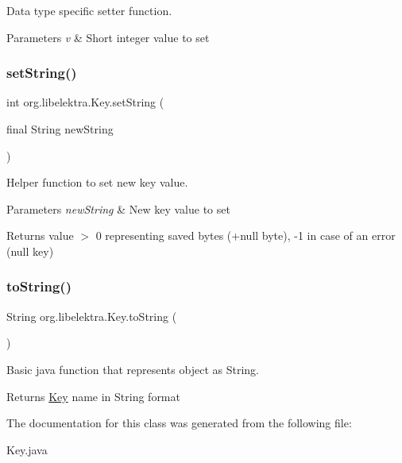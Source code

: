 Data type specific setter function. 


\begin{DoxyParams}{Parameters}
{\em v} & Short integer value to set \\
\hline
\end{DoxyParams}
\mbox{\label{classorg_1_1libelektra_1_1Key_a5ccfaddf110c47c83686655a694ee76d}} 
\subsubsection{\texorpdfstring{set\+String()}{setString()}}
{\footnotesize\ttfamily int org.\+libelektra.\+Key.\+set\+String (\begin{DoxyParamCaption}\item[{final String}]{new\+String }\end{DoxyParamCaption})\hspace{0.3cm}{\ttfamily [inline]}}



Helper function to set new key value. 


\begin{DoxyParams}{Parameters}
{\em new\+String} & New key value to set \\
\hline
\end{DoxyParams}
\begin{DoxyReturn}{Returns}
value $>$ 0 representing saved bytes (+null byte), -\/1 in case of an error (null key) 
\end{DoxyReturn}
\mbox{\label{classorg_1_1libelektra_1_1Key_a2814202c93e4f4dac842b2d4856ba78e}} 
\subsubsection{\texorpdfstring{to\+String()}{toString()}}
{\footnotesize\ttfamily String org.\+libelektra.\+Key.\+to\+String (\begin{DoxyParamCaption}{ }\end{DoxyParamCaption})\hspace{0.3cm}{\ttfamily [inline]}}



Basic java function that represents object as String. 

\begin{DoxyReturn}{Returns}
\hyperlink{classorg_1_1libelektra_1_1Key}{Key} name in String format 
\end{DoxyReturn}


The documentation for this class was generated from the following file\+:\begin{DoxyCompactItemize}
\item 
Key.\+java\end{DoxyCompactItemize}
